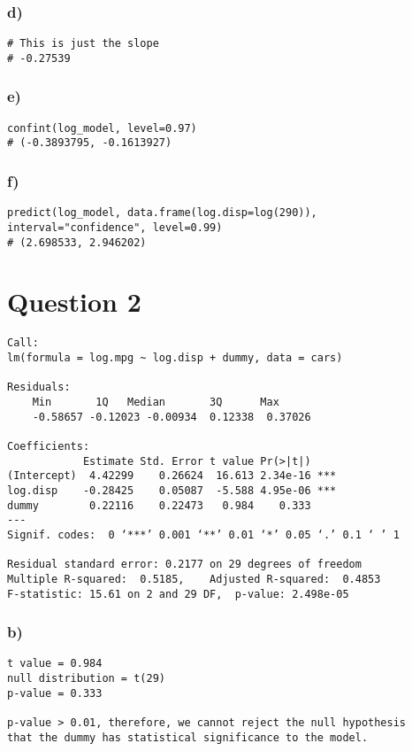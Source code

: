 \documentclass{article}
\begin{document}
\subsubsection*{d)}
\begin{verbatim}
# This is just the slope
# -0.27539
\end{verbatim}
\subsubsection*{e)}
\begin{verbatim}
confint(log_model, level=0.97)
# (-0.3893795, -0.1613927)
\end{verbatim}

\subsubsection*{f)}
\begin{verbatim}
predict(log_model, data.frame(log.disp=log(290)), interval="confidence", level=0.99)
# (2.698533, 2.946202)
\end{verbatim}

\section*{Question 2}
\begin{verbatim}
Call:
lm(formula = log.mpg ~ log.disp + dummy, data = cars)
    
Residuals:
    Min       1Q   Median       3Q      Max 
    -0.58657 -0.12023 -0.00934  0.12338  0.37026 
    
Coefficients:
            Estimate Std. Error t value Pr(>|t|)    
(Intercept)  4.42299    0.26624  16.613 2.34e-16 ***
log.disp    -0.28425    0.05087  -5.588 4.95e-06 ***
dummy        0.22116    0.22473   0.984    0.333    
---
Signif. codes:  0 ‘***’ 0.001 ‘**’ 0.01 ‘*’ 0.05 ‘.’ 0.1 ‘ ’ 1
    
Residual standard error: 0.2177 on 29 degrees of freedom
Multiple R-squared:  0.5185,	Adjusted R-squared:  0.4853 
F-statistic: 15.61 on 2 and 29 DF,  p-value: 2.498e-05
\end{verbatim}

\subsubsection*{b)}
\begin{verbatim}
t value = 0.984
null distribution = t(29)
p-value = 0.333
    
p-value > 0.01, therefore, we cannot reject the null hypothesis
that the dummy has statistical significance to the model.
\end{verbatim}
\newpage
\end{document}
